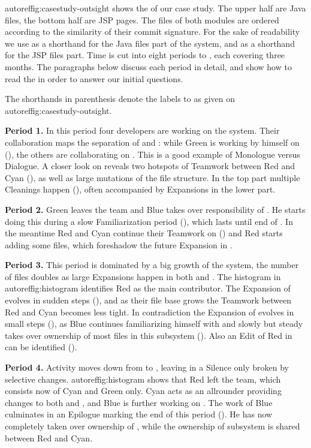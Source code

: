 autoref{fig:casestudy-outsight} shows the \omap of our case study. The upper half are Java files, the bottom half are JSP pages. The files of both modules are ordered according to the similarity of their commit signature. For the sake of readability we use  as a shorthand for the Java files part of the system, and  as a shorthand for the JSP files part. Time is cut into eight periods  to , each covering three months. The paragraphs below discuss each period in detail, and show how to read the \omap in order to answer our initial questions.

The shorthands in parenthesis denote the labels  to  as given on autoref{fig:casestudy-outsight}.

\textbf{Period 1.} In this period four developers are working on the system. Their collaboration maps the separation of  and : while Green is working by himself on  (), the others are collaborating on . This is a good example of Monologue versus Dialogue. A closer look on  reveals two hotspots of Teamwork between Red and Cyan (), as well as large mutations of the file structure. In the top part multiple Cleanings happen (), often accompanied by Expansions in the lower part.

\textbf{Period 2.} Green leaves the team and Blue takes over responsibility of . He starts doing this during a slow Familiarization period (), which lasts until end of . In the meantime Red and Cyan continue their Teamwork on  () and Red starts adding some files, which foreshadow the future Expansion in .

\textbf{Period 3.} This period is dominated by a big growth of the system, the number of files doubles as large Expansions happen in both  and . The histogram in autoref{fig:histogram} identifies Red as the main contributor. The Expansion of  evolves in sudden steps (), and as their file base grows the Teamwork between Red and Cyan becomes less tight. In contradiction the Expansion of  evolves in small steps (), as Blue continues familiarizing himself with  and slowly but steady takes over ownership of most files in this subsystem (). Also an Edit of Red in  can be identified ().

\textbf{Period 4.} Activity moves down from  to , leaving  in a Silence only broken by selective changes. autoref{fig:histogram} shows that Red left the team, which consists now of Cyan and Green only. Cyan acts as an allrounder providing changes to both  and , and Blue is further working on . The work of Blue culminates in an Epilogue marking the end of this period (). He has now completely taken over ownership of , while the ownership of subsystem  is shared between Red and Cyan.

